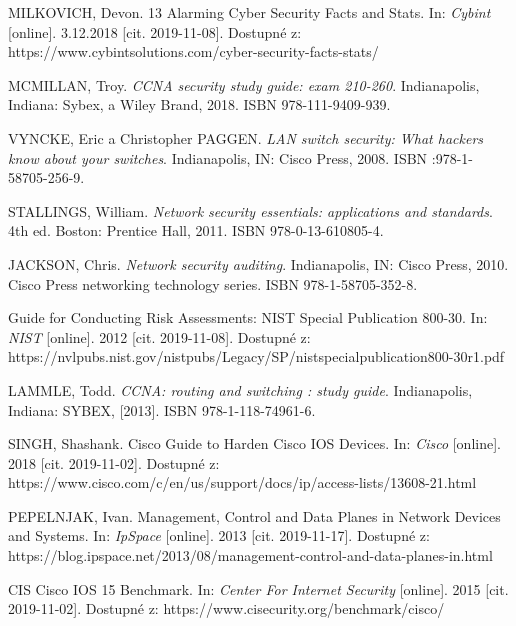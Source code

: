 

\begin{literatura}{99}
MILKOVICH, Devon. 13 Alarming Cyber Security Facts and Stats. In: \textit{Cybint} [online]. 3.12.2018 [cit. 2019-11-08]. Dostupné z: https://www.cybintsolutions.com/cyber-security-facts-stats/

MCMILLAN, Troy. \textit{CCNA security study guide: exam 210-260}. Indianapolis, Indiana: Sybex, a Wiley Brand, 2018. ISBN 978-111-9409-939.

VYNCKE, Eric a Christopher PAGGEN. \textit{LAN switch security: What hackers know about your switches}. Indianapolis, IN: Cisco Press, 2008. ISBN :978-1-58705-256-9.	
	
STALLINGS, William. \textit{Network security essentials: applications and standards}. 4th ed. Boston: Prentice Hall, 2011. ISBN 978-0-13-610805-4.

JACKSON, Chris. \textit{Network security auditing}. Indianapolis, IN: Cisco Press, 2010. Cisco Press networking technology series. ISBN 978-1-58705-352-8.

Guide for Conducting Risk Assessments: NIST Special Publication 800-30. In: \textit{NIST} [online]. 2012 [cit. 2019-11-08]. Dostupné z: https://nvlpubs.nist.gov/nistpubs/Legacy/SP/nistspecialpublication800-30r1.pdf


LAMMLE, Todd. \textit{CCNA: routing and switching : study guide}. Indianapolis,
Indiana: SYBEX, [2013]. ISBN 978-1-118-74961-6.

SINGH, Shashank. Cisco Guide to Harden Cisco IOS Devices. In: \textit{Cisco} [online]. 2018 [cit. 2019-11-02]. Dostupné z: https://www.cisco.com/c/en/us/support/docs/ip/access-lists/13608-21.html
	
PEPELNJAK, Ivan. Management, Control and Data Planes in Network Devices and Systems. In: \textit{IpSpace} [online]. 2013 [cit. 2019-11-17]. Dostupné z: https://blog.ipspace.net/2013/08/management-control-and-data-planes-in.html

CIS Cisco IOS 15 Benchmark. In: \textit{Center For Internet Security} [online]. 2015 [cit. 2019-11-02]. Dostupné z: https://www.cisecurity.org/benchmark/cisco/


\end{literatura}
